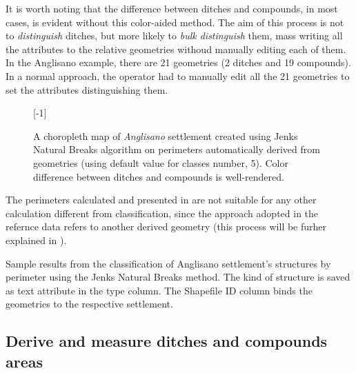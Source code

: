             It is worth noting that the difference between ditches and compounds, in most cases, is evident without this color-aided method. The aim of this process is not to \emph{distinguish} ditches, but more likely to \emph{bulk distinguish} them, mass writing all the attributes to the relative geometries withoud manually editing each of them. In the Anglisano example, there are 21 geometries (2 ditches and 19 compounds). In a normal approach, the operator had to manually edit all the 21 geometries to set the attributes distinguishing them.

            \begin{figure}[H]
                \centering
                \scalebox{1}[-1]{ %
                    \begin{tikzpicture}[x=1mm,y=1mm,scale=0.22]
                        
                    \end{tikzpicture}
                }
                \caption[A choropleth map of \emph{Anglisano} settlement using Jenks Natural Breaks]{A choropleth map of \emph{Anglisano} settlement created using Jenks Natural Breaks algorithm on perimeters automatically derived from geometries (using default value for classes number, 5). Color difference between ditches and compounds is well-rendered.}
                \label{fig:jenks-color}
            \end{figure}

            The perimeters calculated and presented in  are not suitable for any other calculation different from classification, since the approach adopted in the refernce data \cite{laterza} refers to another derived geometry (this process will be furher explained in ).

            \begin{table}[!htb]
                \centering
                
                \caption[Sample geometry classification results from Anglisano settlements using Jenk Natural Breaks method]{Sample results from the classification of Anglisano settlement's structures by perimeter using the Jenks Natural Breaks method. The kind of structure is saved as text attribute in the \textsf{type} column. The \textsf{Shapefile ID} column binds the geometries to the respective settlement.}
                \label{tab:jnb-results}
            \end{table}

            \pagebreak
        \subsection{Derive and measure ditches and compounds areas\label{sec:comp-area}}

